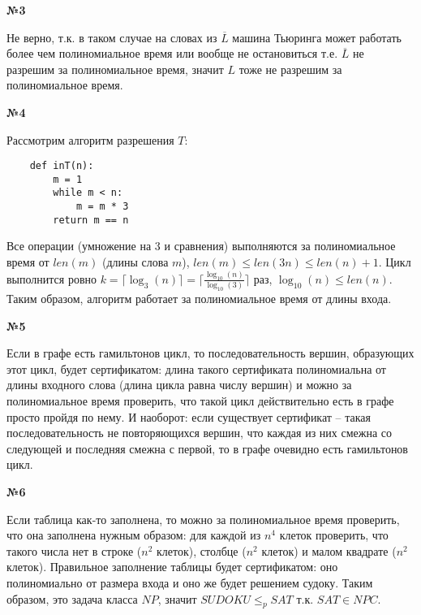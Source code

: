 \documentclass{article}
\newenvironment{task}{\begin{center}\fontsize{14}{14}\selectfont\bf}{\rm\fontsize{12}{12}\selectfont\end{center}}
\begin{document}
	
	\begin{task} 
		№3
	\end{task}
	
	Не верно, т.к. в таком случае на словах из $\overline{L}$ машина Тьюринга может работать более чем полиномиальное время или вообще не остановиться т.е. $\overline{L}$ не разрешим за полиномиальное время, значит $L$ тоже не разрешим за полиномиальное время.
	
		
	\begin{task} 
		№4
	\end{task}
	
	Рассмотрим алгоритм разрешения $T$:
	\begin{lstlisting}
	def inT(n):
		m = 1
		while m < n:
			m = m * 3
		return m == n
	\end{lstlisting}
	Все операции (умножение на 3 и сравнения) выполняются за полиномиальное время от $len(m)$ (длины слова $m$), $len(m) \leq len(3n) \leq len(n) + 1$. Цикл выполнится ровно $k = \lceil \log_3(n) \rceil = \lceil \frac{\log_{10}(n)}{\log_{10}(3)} \rceil$ раз, $\log_{10}(n) \leq len(n)$. Таким образом, алгоритм работает за полиномиальное время от длины входа.

	
	
	
	
			
	\begin{task} 
		№5
	\end{task}

	Если в графе есть гамильтонов цикл, то последовательность вершин, образующих этот цикл, будет сертификатом: длина такого сертификата полиномиальна от длины входного слова (длина цикла равна числу вершин) и можно за полиномиальное время проверить, что такой цикл действительно есть в графе просто пройдя по нему. И наоборот: если существует сертификат -- такая последовательность не повторяющихся вершин, что каждая из них смежна со следующей и последняя смежна с первой, то в графе очевидно есть гамильтонов цикл.
	





	\begin{task} 
		№6
	\end{task}

	Если таблица как-то заполнена, то можно за полиномиальное время проверить, что она заполнена нужным образом: для каждой из $n^4$ клеток проверить, что такого числа нет в строке ($n^2$ клеток), столбце ($n^2$ клеток) и малом квадрате ($n^2$ клеток). Правильное заполнение таблицы будет сертификатом: оно полиномиально от размера входа и оно же будет решением судоку. Таким образом, это задача класса $NP$, значит $SUDOKU \leq_p SAT$ т.к. $SAT \in NPC$.
	
	
	
	
\end{document}
